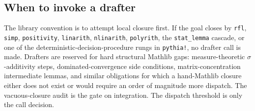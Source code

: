 \subsection{When to invoke a drafter}
\label{sec:aristotle-when}

The library convention is to attempt local closure first. If the
goal closes by \texttt{rfl}, \texttt{simp}, \texttt{positivity},
\texttt{linarith}, \texttt{nlinarith}, \texttt{polyrith}, the
\texttt{stat\_lemma} cascade, or one of the
deterministic-decision-procedure rungs in \texttt{pythia!}, no
drafter call is made. Drafters are reserved for hard structural
Mathlib gaps: measure-theoretic $\sigma$-additivity steps,
dominated-convergence side conditions, matrix-concentration
intermediate lemmas, and similar obligations for which a
hand-Mathlib closure either does not exist or would require an
order of magnitude more dispatch. The vacuous-closure audit is
the gate on integration. The dispatch threshold is only the
call decision.
